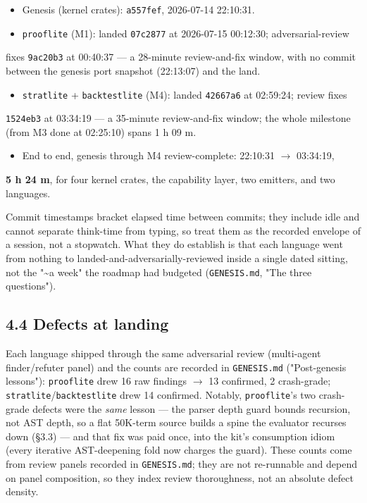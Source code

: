 \documentclass[11pt]{article}
\newcommand{\code}[1]{\texttt{#1}}
\begin{document}
\begin{itemize}[leftmargin=*]
\item Genesis (kernel crates): \code{a557fef}, 2026-07-14 22:10:31.
\item \code{prooflite} (M1): landed \code{07c2877} at 2026-07-15 00:12:30; adversarial-review
\end{itemize}
  fixes \code{9ac20b3} at 00:40:37 --- a 28-minute review-and-fix window, with no
  commit between the genesis port snapshot (22:13:07) and the land.
\begin{itemize}[leftmargin=*]
\item \code{stratlite} + \code{backtestlite} (M4): landed \code{42667a6} at 02:59:24; review fixes
\end{itemize}
  \code{1524eb3} at 03:34:19 --- a 35-minute review-and-fix window; the whole milestone
  (from M3 done at 02:25:10) spans 1 h 09 m.
\begin{itemize}[leftmargin=*]
\item End to end, genesis through M4 review-complete: 22:10:31 $\rightarrow$ 03:34:19,
\end{itemize}
  \textbf{5 h 24 m}, for four kernel crates, the capability layer, two emitters, and
  two languages.

Commit timestamps bracket elapsed time between commits; they include idle and
cannot separate think-time from typing, so treat them as the recorded envelope
of a session, not a stopwatch. What they do establish is that each language went
from nothing to landed-and-adversarially-reviewed inside a single dated sitting,
not the "\textasciitilde{}a week" the roadmap had budgeted (\code{GENESIS.md}, "The three
questions").

\subsection*{4.4 Defects at landing}

Each language shipped through the same adversarial review (multi-agent
finder/refuter panel) and the counts are recorded in \code{GENESIS.md} ("Post-genesis
lessons"): \code{prooflite} drew 16 raw findings $\rightarrow$ 13 confirmed, 2 crash-grade;
\code{stratlite}/\code{backtestlite} drew 14 confirmed. Notably, \code{prooflite}'s two
crash-grade defects were the \emph{same} lesson --- the parser depth guard bounds
recursion, not AST depth, so a flat 50K-term source builds a spine the evaluator
recurses down (\S{}3.3) --- and that fix was paid once, into the kit's consumption
idiom (every iterative AST-deepening fold now charges the guard). These counts
come from review panels recorded in \code{GENESIS.md}; they are not re-runnable and
depend on panel composition, so they index review thoroughness, not an absolute
defect density.
\end{document}
